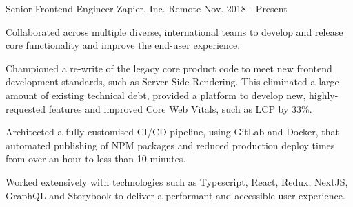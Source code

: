 

\begin{cventries}

  \cventry
    {Senior Frontend Engineer} %
    {Zapier, Inc.} %
    {Remote} %
    {Nov. 2018 - Present} %
    {
      \begin{cvitems} %
        \item {
          Collaborated across multiple diverse, international teams to develop and release core functionality and
          improve the end-user experience.
        }
        \item {
          Championed a re-write of the legacy core product code to meet new frontend development standards, such as
          Server-Side Rendering. This eliminated a large amount of existing technical debt, provided a platform to
          develop new, highly-requested features and improved Core Web Vitals, such as LCP by 33\%.
        }
        \item{
          Architected a fully-customised CI/CD pipeline, using GitLab and Docker, that automated publishing of NPM
          packages and reduced production deploy times from over an hour to less than 10 minutes.
        }
        \item {
          Worked extensively with technologies such as Typescript, React, Redux, NextJS, GraphQL and Storybook to
          deliver a performant and accessible user experience.
        }
      \end{cvitems}
    }


\end{cventries}
